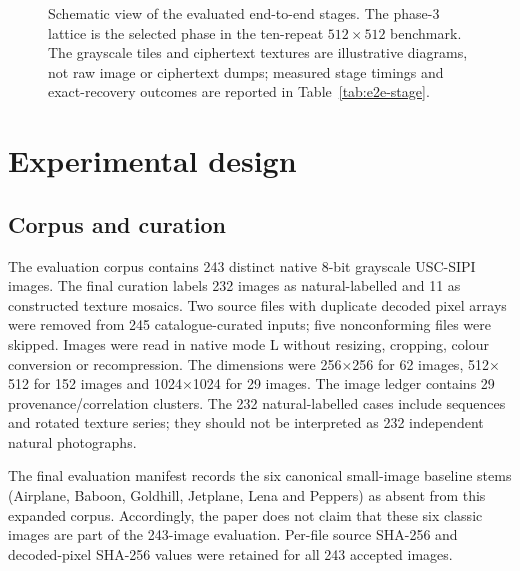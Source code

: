 \documentclass[preprint,12pt,a4paper]{elsarticle}
\begin{document}
\begin{figure}[t]
{%
}
\caption{Schematic view of the evaluated end-to-end stages. The phase-3 lattice is the selected phase in the ten-repeat $512\times512$ benchmark. The grayscale tiles and ciphertext textures are illustrative diagrams, not raw image or ciphertext dumps; measured stage timings and exact-recovery outcomes are reported in Table~\ref{tab:e2e-stage}.}
\label{fig:e2e-stages}
\end{figure}


\section{Experimental design}
\label{sec:experiments}

\subsection{Corpus and curation}

The evaluation corpus contains 243 distinct native 8-bit grayscale USC-SIPI images. The final curation labels 232 images as natural-labelled and 11 as constructed texture mosaics. Two source files with duplicate decoded pixel arrays were removed from 245 catalogue-curated inputs; five nonconforming files were skipped. Images were read in native mode L without resizing, cropping, colour conversion or recompression. The dimensions were 256$\times$256 for 62 images, 512$\times$512 for 152 images and 1024$\times$1024 for 29 images. The image ledger contains 29 provenance/correlation clusters. The 232 natural-labelled cases include sequences and rotated texture series; they should not be interpreted as 232 independent natural photographs.

The final evaluation manifest records the six canonical small-image baseline stems (Airplane, Baboon, Goldhill, Jetplane, Lena and Peppers) as absent from this expanded corpus. Accordingly, the paper does not claim that these six classic images are part of the 243-image evaluation. Per-file source SHA-256 and decoded-pixel SHA-256 values were retained for all 243 accepted images.
\end{document}

